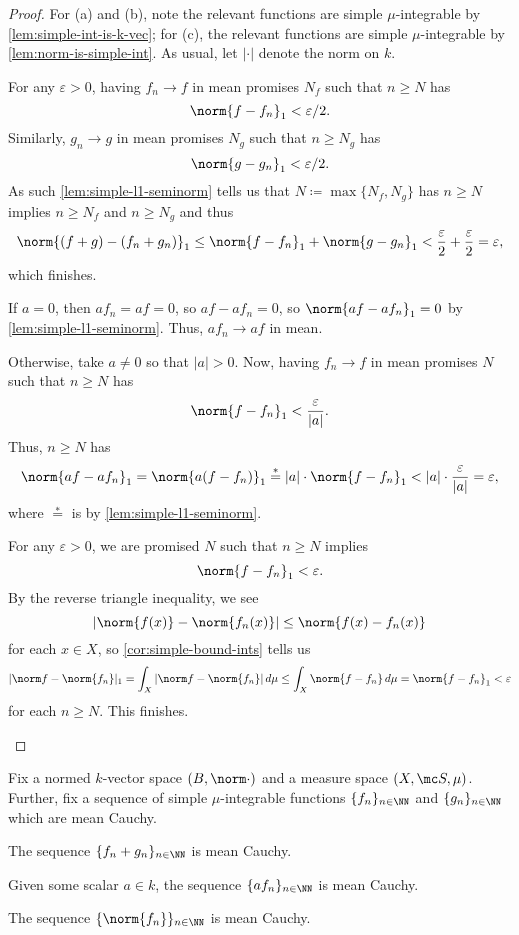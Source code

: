 \documentclass[../notes.tex]{subfiles}
\begin{document}
\begin{proof}
	For (a) and (b), note the relevant functions are simple $\mu$-integrable by \autoref{lem:simple-int-is-k-vec}; for (c), the relevant functions are simple $\mu$-integrable by \autoref{lem:norm-is-simple-int}. As usual, let $|\cdot|$ denote the norm on $k$.
	\begin{listalph}
		\item For any $\varepsilon>0$, having $f_n\to f$ in mean promises $N_f$ such that $n\ge N$ has
		\[\norm{f-f_n}_1<\varepsilon/2.\]
		Similarly, $g_n\to g$ in mean promises $N_g$ such that $n\ge N_g$ has
		\[\norm{g-g_n}_1<\varepsilon/2.\]
		As such \autoref{lem:simple-l1-seminorm} tells us that $N\coloneqq\max\{N_f,N_g\}$ has $n\ge N$ implies $n\ge N_f$ and $n\ge N_g$ and thus
		\[\norm{(f+g)-(f_n+g_n)}_1\le\norm{f-f_n}_1+\norm{g-g_n}_1<\frac\varepsilon2+\frac\varepsilon2=\varepsilon,\]
		which finishes.
		\item If $a=0$, then $af_n=af=0$, so $af-af_n=0$, so $\norm{af-af_n}_1=0$ by \autoref{lem:simple-l1-seminorm}. Thus, $af_n\to af$ in mean.

		Otherwise, take $a\ne0$ so that $|a|>0$. Now, having $f_n\to f$ in mean promises $N$ such that $n\ge N$ has
		\[\norm{f-f_n}_1<\frac\varepsilon{|a|}.\]
		Thus, $n\ge N$ has
		\[\norm{af-af_n}_1=\norm{a(f-f_n)}_1\stackrel*=|a|\cdot\norm{f-f_n}_1<|a|\cdot\frac\varepsilon{|a|}=\varepsilon,\]
		where $\stackrel*=$ is by \autoref{lem:simple-l1-seminorm}.
		\item For any $\varepsilon>0$, we are promised $N$ such that $n\ge N$ implies
		\[\norm{f-f_n}_1<\varepsilon.\]
		By the reverse triangle inequality, we see
		\[|\norm{f(x)}-\norm{f_n(x)}|\le\norm{f(x)-f_n(x)}\]
		for each $x\in X$, so \autoref{cor:simple-bound-ints} tells us
		\[|\norm f-\norm{f_n}|_1=\int_X|\norm f-\norm{f_n}|\,d\mu\le\int_X\norm{f-f_n}\,d\mu=\norm{f-f_n}_1<\varepsilon\]
		for each $n\ge N$. This finishes.
		\qedhere
	\end{listalph}
\end{proof}
\begin{lemma} \label{lem:linear-combo-mean-cauchy}
	Fix a normed $k$-vector space $(B,\norm\cdot)$ and a measure space $(X,\mc S,\mu)$. Further, fix a sequence of simple $\mu$-integrable functions $\{f_n\}_{n\in\NN}$ and $\{g_n\}_{n\in\NN}$ which are mean Cauchy.
	\begin{listalph}
		\item The sequence $\{f_n+g_n\}_{n\in\NN}$ is mean Cauchy.
		\item Given some scalar $a\in k$, the sequence $\{af_n\}_{n\in\NN}$ is mean Cauchy.
		\item The sequence $\{\norm{f_n}\}_{n\in\NN}$ is mean Cauchy.
	\end{listalph}
\end{lemma}
\end{document}
